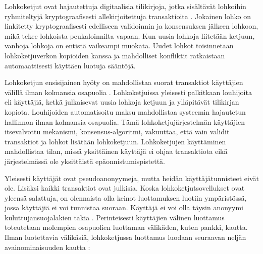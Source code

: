 \documentclass[utf8,bachelor]{gradu3}
\begin{document}
Lohkoketjut ovat hajautettuja digitaalisia tilikirjoja, jotka sisältävät lohkoihin ryhmiteltyjä kryptograafisesti allekirjoitettuja transaktioita \parencite{yaga2019blockchain}.
Jokainen lohko on linkitetty kryptograafisesti edelliseen validoinnin ja konsensuksen jälkeen lohkoon, mikä tekee lohkoista peukaloinnilta vapaan.
Kun uusia lohkoja liitetään ketjuun, vanhoja lohkoja on entistä vaikeampi muokata. 
Uudet lohkot toisinnetaan lohkoketjuverkon kopioiden kanssa ja mahdolliset konfliktit ratkaistaan automaattisesti käyttäen luotuja sääntöjä.


Lohkoketjun ensisijainen hyöty on mahdollistaa suorat transaktiot käyttäjien välillä ilman kolmansia osapuolia \parencite{yaga2019blockchain}.
Lohkoketjuissa yleisesti palkitkaan louhijoita eli käyttäjiä, ketkä julkaisevat uusia lohkoja ketjuun ja ylläpitävät tilikirjan kopiota.
Louhijoiden automatisoitu maksu mahdollistaa systeemin hajautetun hallinnon ilman kolmansia osapuolia.
Tämä lohkoketjujärjestelmän käyttäjien itsevalvottu mekanismi, konsensus-algoritmi, vakuuttaa, että vain validit transaktiot ja lohkot lisätään lohkoketjuun.
Lohkoketjujen käyttäminen mahdollistaa tilan, missä yksittäinen käyttäjä ei ohjaa transaktiota eikä järjestelmässä ole yksittäistä epäonnistumispistettä.

Yleisesti käyttäjät ovat pseudoanonyymeja, mutta heidän käyttäjätunnisteet eivät ole. 
Lisäksi kaikki transaktiot ovat julkisia. 
Koska lohkoketjutsovellukset ovat yleensä salattuja, on olennaista olla keinot luottamuksen luotiin ympäristössä, jossa käyttäjiä ei voi tunnistaa suoraan. 
Käyttäjä ei voi olla täysin anonyymi kuluttujansuojalakien takia \parencite{yaga2019blockchain}.
Perinteisesti käyttäjien välinen luottamus toteutetaan molempien osapuolien luottaman välikäden, kuten pankki, kautta.
Ilman luotettavia välikäsiä, lohkoketjussa luottamus luodaan seuraavan neljän avainominaisuuden kautta \parencite{zarrin2021blockchain}:
\end{document}
